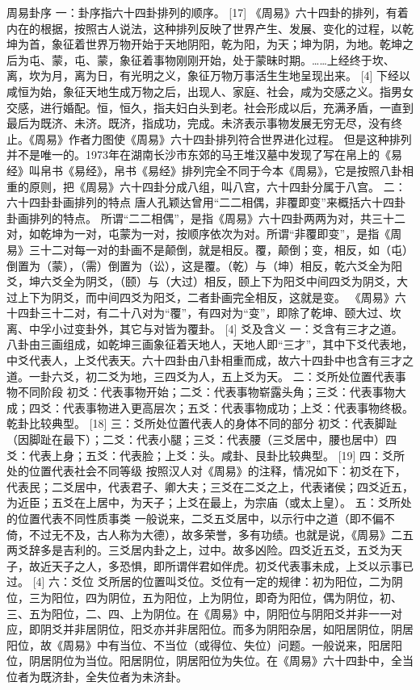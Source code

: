 \documentclass[12pt,UTF8]{ctexbook}
\begin{document}
周易卦序
一：卦序指六十四卦排列的顺序。 [17]
《周易》六十四卦的排列，有着内在的根据，按照古人说法，这种排列反映了世界产生、发展、变化的过程，以乾坤为首，象征着世界万物开始于天地阴阳，乾为阳，为天；坤为阴，为地。乾坤之后为屯、蒙，屯、蒙，象征着事物刚刚开始，处于蒙昧时期。……上经终于坎、离，坎为月，离为日，有光明之义，象征万物万事活生生地呈现出来。 [4]
下经以咸恒为始，象征天地生成万物之后，出现人、家庭、社会，咸为交感之义。指男女交感，进行婚配。恒，恒久，指夫妇白头到老。社会形成以后，充满矛盾，一直到最后为既济、未济。既济，指成功，完成。未济表示事物发展无穷无尽，没有终止。《周易》作者力图使《周易》六十四卦排列符合世界进化过程。
但是这种排列并不是唯一的。1973年在湖南长沙市东郊的马王堆汉墓中发现了写在帛上的《易经》叫帛书《易经》，帛书《易经》排列完全不同于今本《周易》，它是按照八卦相重的原则，把《周易》六十四卦分成八组，叫八宫，六十四卦分属于八宫。
二：六十四卦卦画排列的特点
唐人孔颖达曾用“二二相偶，非覆即变”来概括六十四卦卦画排列的特点。
所谓“二二相偶”，是指《周易》六十四卦两两为对，共三十二对，如乾坤为一对，屯蒙为一对，按顺序依次为对。所谓“非覆即变”，是指《周易》三十二对每一对的卦画不是颠倒，就是相反。覆，颠倒；变，相反，如（屯）倒置为（蒙），（需）倒置为（讼），这是覆。（乾）与（坤）相反，乾六爻全为阳爻，坤六爻全为阴爻，（颐）与（大过）相反，颐上下为阳爻中间四爻为阴爻，大过上下为阴爻，而中间四爻为阳爻，二者卦画完全相反，这就是变。
《周易》六十四卦三十二对，有二十八对为“覆”，有四对为“变”，即除了乾坤、颐大过、坎离、中孚小过变卦外，其它与对皆为覆卦。 [4]
爻及含义
一：爻含有三才之道。
八卦由三画组成，如乾坤三画象征着天地人，天地人即“三才”，其中下爻代表地，中爻代表人，上爻代表天。六十四卦由八卦相重而成，故六十四卦中也含有三才之道。一卦六爻，初二爻为地，三四爻为人，五上爻为天。
二：爻所处位置代表事物不同阶段
初爻：代表事物开始；二爻：代表事物崭露头角；三爻：代表事物大成；四爻：代表事物进入更高层次；五爻：代表事物成功；上爻：代表事物终极。乾卦比较典型。 [18]
三：爻所处位置代表人的身体不同的部分
初爻：代表脚趾（因脚趾在最下）；二爻：代表小腿；三爻：代表腰（三爻居中，腰也居中）四爻：代表上身；五爻：代表脸；上爻：头。咸卦、艮卦比较典型。 [19]
四：爻所处的位置代表社会不同等级
按照汉人对《周易》的注释，情况如下：初爻在下，代表民；二爻居中，代表君子、卿大夫；三爻在二爻之上，代表诸侯；四爻近五，为近臣；五爻在上居中，为天子；上爻在最上，为宗庙（或太上皇）。
五：爻所处的位置代表不同性质事类
一般说来，二爻五爻居中，以示行中之道（即不偏不倚，不过无不及，古人称为大德），故多荣誉，多有功绩。也就是说，《周易》二五两爻辞多是吉利的。三爻居内卦之上，过中。故多凶险。四爻近五爻，五爻为天子，故近天子之人，多恐惧，即所谓伴君如伴虎。初爻代表事未成，上爻以示事已过。 [4]
六：爻位
爻所居的位置叫爻位。爻位有一定的规律：初为阳位，二为阴位，三为阳位，四为阴位，五为阳位，上为阴位，即奇为阳位，偶为阴位，初、三、五为阳位，二、四、上为阴位。在《周易》中，阴阳位与阴阳爻并非一一对应，即阴爻并非居阴位，阳爻亦并非居阳位。而多为阴阳杂居，如阳居阴位，阴居阳位，故《周易》中有当位、不当位（或得位、失位）问题。一般说来，阳居阳位，阴居阴位为当位。阳居阴位，阴居阳位为失位。在《周易》六十四卦中，全当位者为既济卦，全失位者为未济卦。
\end{document}
